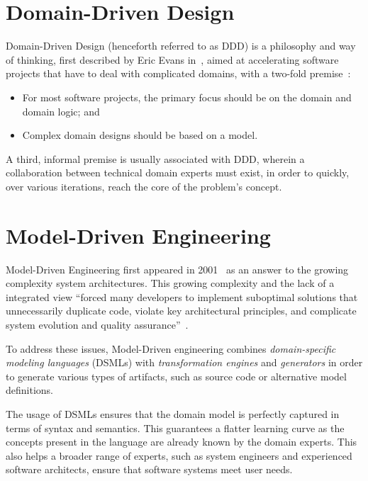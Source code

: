 \section{Domain-Driven Design}\label{sec:ddd}

Domain-Driven Design (henceforth referred to as DDD) is a philosophy and way of thinking, first described by Eric Evans in~\cite{ddd_book}, aimed at accelerating software projects that have to deal with complicated domains,  with a two-fold premise~\cite{ddd_website}:

\begin{itemize}
  \item For most software projects, the primary focus should be on the domain and domain logic; and
  \item Complex domain designs should be based on a model.
\end{itemize}

A third, informal premise is usually associated with DDD, wherein a collaboration between technical domain experts must exist, in order to quickly, over various iterations, reach the core of the problem's concept.

\section{Model-Driven Engineering}\label{sec:mda}

Model-Driven Engineering first appeared in 2001~\cite{Mil03} as an answer to the growing complexity system architectures. This growing complexity and the lack of a integrated view ``forced many developers to implement suboptimal solutions that unnecessarily duplicate code, violate key architectural principles, and complicate system evolution and quality assurance''~\cite{Sch06}.

To address these issues, Model-Driven engineering combines \emph{domain-specific modeling languages} (DSMLs) with \emph{transformation engines} and \emph{generators} in order to generate various types of artifacts, such as source code or alternative model definitions.

The usage of DSMLs ensures that the domain model is perfectly captured in terms of syntax and semantics. This guarantees a flatter learning curve as the concepts present in the language are already known by the domain experts. This also helps a broader range of experts, such as system engineers and experienced software architects, ensure that software systems meet user needs.

